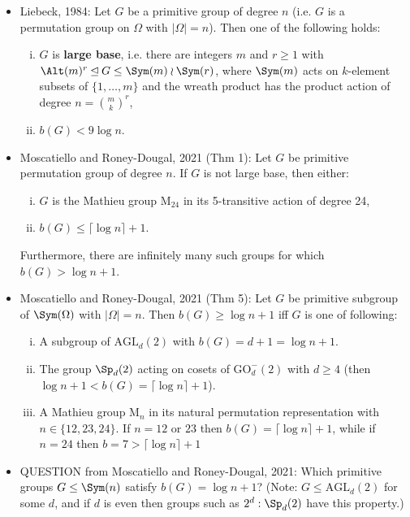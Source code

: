 \begin{itemize}
    \item Liebeck, 1984: Let $G$ be a primitive group of degree $n$ (i.e. $G$ is a permutation group on $\Omega$ with $|\Omega| = n$). Then one of the following holds:
          \begin{enumerate}[(i)]
              \item $G$ is \textbf{large base}, i.e. there are integers $m$ and $r \geq 1$ with $\Alt(m)^r \unlhd G \leq \Sym(m) \wr \Sym(r)$, where $\Sym(m)$ acts on $k$-element subsets of $\{1,\dotsc,m\}$ and the wreath product has the product action of degree $n = \binom{m}{k}^r$,
              \item $b(G) < 9\log n$.
          \end{enumerate}
    \item Moscatiello and Roney-Dougal, 2021 (Thm 1): Let $G$ be primitive permutation group of degree $n$. If $G$ is not large base, then either:
          \begin{enumerate}[(i)]
              \item $G$ is the Mathieu group $\mathrm{M}_{24}$ in its 5-transitive action of degree 24,
              \item $b(G) \leq \lceil\log n\rceil + 1$.
          \end{enumerate}
          Furthermore, there are infinitely many such groups for which $b(G) > \log n + 1$.
    \item Moscatiello and Roney-Dougal, 2021 (Thm 5): Let $G$ be primitive subgroup of $\Sym(\Omega)$ with $|\Omega| = n$. Then $b(G) \geq \log n + 1$ iff $G$ is one of following:
          \begin{enumerate}[(i)]
              \item A subgroup of $\mathrm{AGL}_d(2)$ with $b(G) = d + 1 = \log n + 1$.
              \item The group $\Sp_d(2)$ acting on cosets of $\mathrm{GO}^-_d(2)$ with $d \geq 4$ (then $\log n + 1 < b(G) = \lceil\log n\rceil + 1$).
              \item A Mathieu group $\mathrm{M}_n$ in its natural permutation representation with $n \in \{12,23,24\}$. If $n = 12$ or $23$ then $b(G) = \lceil\log n\rceil + 1$, while if $n = 24$ then $b = 7 > \lceil\log n\rceil + 1$
          \end{enumerate}
    \item QUESTION from Moscatiello and Roney-Dougal, 2021: Which primitive groups $G \leq \Sym(n)$ satisfy $b(G) = \log n + 1$? (Note: $G \leq \mathrm{AGL}_d(2)$ for some $d$, and if $d$ is even then groups such as $2^d : \Sp_d(2)$ have this property.)
\end{itemize}

